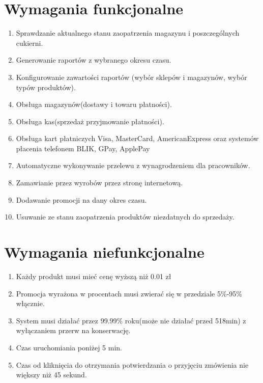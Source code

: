 \documentclass{article}
\begin{document}
\section{Wymagania funkcjonalne}
\begin{enumerate}
\item Sprawdzanie aktualnego stanu zaopatrzenia magazynu i poszczególnych cukierni.
\item Generowanie raportów z wybranego okresu czasu.
\item Konfigurowanie zawartości raportów (wybór sklepów i magazynów, wybór typów produktów).
\item Obsługa magazynów(dostawy i towaru płatności).
\item Obsługa kas(sprzedaż przyjmowanie płatności).
\item Obsługa kart płatniczych Visa, MasterCard, AmericanExpress oraz systemów płacenia telefonem BLIK, GPay, ApplePay
\item Automatyczne wykonywanie przelewu z wynagrodzeniem dla pracowników.
\item Zamawianie przez wyrobów przez stronę internetową.
\item Dodawanie promocji na dany okres czasu.
\item Usuwanie ze stanu zaopatrzenia produktów niezdatnych do sprzedaży.
\end{enumerate}
\section{Wymagania niefunkcjonalne}
\begin{enumerate}
\item Każdy produkt musi mieć cenę wyższą niż 0.01 zł
\item Promocja wyrażona w procentach musi zwierać się w przedziale 5\%-95\% włącznie.
\item System musi działać przez 99.99\% roku(może nie działać przed 518min) z wyłączaniem przerw na konserwację.
\item Czas uruchomiania poniżej 5 min.
\item Czas od kliknięcia do otrzymania potwierdzania o przyjęciu zmówienia nie większy niż 45 sekund. 
\end{enumerate}
\end{document}
